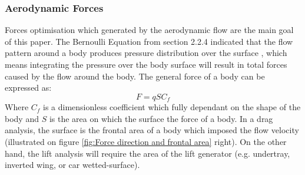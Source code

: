 \subsubsection{Aerodynamic Forces}
Forces optimisation which generated by the aerodynamic flow are the main goal of this paper. The Bernoulli Equation from section 2.2.4 indicated that the flow pattern around a body produces pressure distribution over the surface \cite{Scibor-Rylski1984RoadAerodynamics}, which means integrating the pressure over the body surface will result in total forces caused by the flow around the body. The general force of a body can be expressed as:
\begin{equation}
    F = qSC_f
\end{equation}
Where $C_f$ is a dimensionless coefficient which fully dependant on the shape of the body \cite{Scibor-Rylski1984RoadAerodynamics} and $S$ is the area on which the surface the force of a body. In a drag analysis, the surface is the frontal area of a body which imposed the flow velocity (illustrated on figure \ref{fig:Force direction and frontal area} right). On the other hand, the lift analysis will require the area of the lift generator (e.g. undertray, inverted wing, or car wetted-surface).

